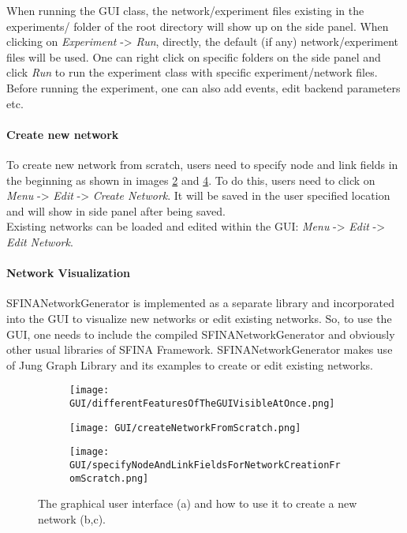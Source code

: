 \documentclass[11pt,fleqn]{book} %
\begin{document}
When running the GUI class, the network/experiment files existing in the experiments/ folder of the root directory will show up on the side panel. When clicking on \textit{Experiment} -> \textit{Run}, directly, the default (if any) network/experiment files will be used. One can right click on specific folders on the side panel and click \textit{Run} to run the experiment class with specific experiment/network files. Before running the experiment, one can also add events, edit backend parameters etc.

\paragraph{Create new network} To create new network from scratch, users need to specify node and link fields in the beginning as shown in images \ref{fig:GUIcreate1} and \ref{fig:GUIcreate2}. To do this, users need to click on \textit{Menu} -> \textit{Edit} -> \textit{Create Network}. It will be saved in the user specified location and will show in side panel after being saved. \\
Existing networks can be loaded and edited within the GUI: \textit{Menu} -> \textit{Edit} -> \textit{Edit Network}.

\paragraph{Network Visualization} SFINANetworkGenerator is implemented as a separate library and incorporated into the GUI to visualize new networks or edit existing networks. So, to use the GUI, one needs to include the compiled SFINANetworkGenerator and obviously other usual libraries of SFINA Framework. SFINANetworkGenerator makes use of Jung Graph Library and its examples to create or edit existing networks.

\begin{figure}[h]
\centering
\begin{subfigure}[t]{0.9\columnwidth}
	\texttt{[image: GUI/differentFeaturesOfTheGUIVisibleAtOnce.png]}
	\caption{}\label{fig:GUI}
\end{subfigure}

\begin{subfigure}[t]{0.45\columnwidth}
	\texttt{[image: GUI/createNetworkFromScratch.png]}
	\caption{}\label{fig:GUIcreate1}
\end{subfigure}
\begin{subfigure}[t]{0.45\columnwidth}
	\texttt{[image: GUI/specifyNodeAndLinkFieldsForNetworkCreationFromScratch.png]}
	\caption{}\label{fig:GUIcreate2}
\end{subfigure}
\caption{The graphical user interface (a) and how to use it to create a new network (b,c).}
\end{figure}
\end{document}
